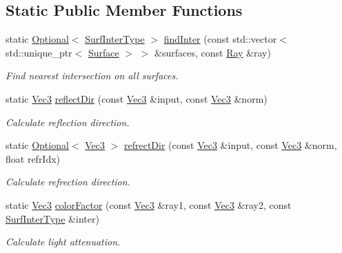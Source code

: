 \subsection*{Static Public Member Functions}
\begin{DoxyCompactItemize}
\item 
static \hyperlink{classOptional}{Optional}$<$ \hyperlink{structSurfInterType}{Surf\+Inter\+Type} $>$ \hyperlink{classTrace_a8c00d14f0bf81947f50a8f31a71f92a2}{find\+Inter} (const std\+::vector$<$ std\+::unique\+\_\+ptr$<$ \hyperlink{classSurface}{Surface} $>$ $>$ \&surfaces, const \hyperlink{structRay}{Ray} \&ray)
\begin{DoxyCompactList}\small\item\em Find nearest intersection on all surfaces. \end{DoxyCompactList}\item 
static \hyperlink{vec_8h_ae4fcaa7c0a3935930ed1be5f70b90373}{Vec3} \hyperlink{classTrace_aa41cdecb2f1cade91f6b4f5984caf80d}{reflect\+Dir} (const \hyperlink{vec_8h_ae4fcaa7c0a3935930ed1be5f70b90373}{Vec3} \&input, const \hyperlink{vec_8h_ae4fcaa7c0a3935930ed1be5f70b90373}{Vec3} \&norm)
\begin{DoxyCompactList}\small\item\em Calculate reflection direction. \end{DoxyCompactList}\item 
static \hyperlink{classOptional}{Optional}$<$ \hyperlink{vec_8h_ae4fcaa7c0a3935930ed1be5f70b90373}{Vec3} $>$ \hyperlink{classTrace_acb72c69982228a36045ef13b17fe5f11}{refrect\+Dir} (const \hyperlink{vec_8h_ae4fcaa7c0a3935930ed1be5f70b90373}{Vec3} \&input, const \hyperlink{vec_8h_ae4fcaa7c0a3935930ed1be5f70b90373}{Vec3} \&norm, float refr\+Idx)
\begin{DoxyCompactList}\small\item\em Calculate refrection direction. \end{DoxyCompactList}\item 
static \hyperlink{vec_8h_ae4fcaa7c0a3935930ed1be5f70b90373}{Vec3} \hyperlink{classTrace_a49d8f6c6b4e6a300f92f8eb710a8a486}{color\+Factor} (const \hyperlink{vec_8h_ae4fcaa7c0a3935930ed1be5f70b90373}{Vec3} \&ray1, const \hyperlink{vec_8h_ae4fcaa7c0a3935930ed1be5f70b90373}{Vec3} \&ray2, const \hyperlink{structSurfInterType}{Surf\+Inter\+Type} \&inter)
\begin{DoxyCompactList}\small\item\em Calculate light attenuation. \end{DoxyCompactList}\item 

\end{DoxyCompactItemize}
